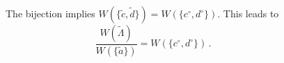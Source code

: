 \documentclass{amsart}
\begin{document}
\begin{figure}
\caption{\label{fig:x} The bijection implies
 $W(\{{\tilde c},{\tilde d}\}) = W(\{c^\circ,d^\circ \})$.
This leads to
 $$ \frac{W({\tilde \Lambda})}{W(\{{\tilde a}\})} = W(\{c^\circ,d^\circ\}) \, .$$ }
\end{figure}
\end{document}

